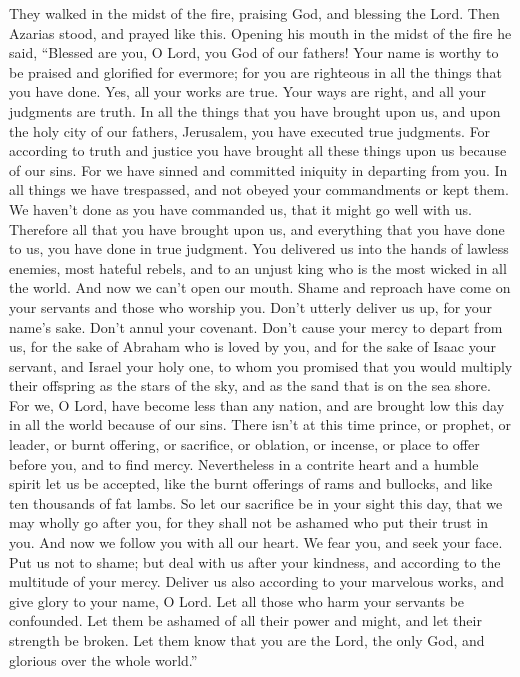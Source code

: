  They walked in the midst of the fire, praising God, and
blessing the Lord.  Then Azarias stood, and prayed like
this. Opening his mouth in the midst of the fire he said, 
``Blessed are you, O Lord, you God of our fathers! Your name is worthy
to be praised and glorified for evermore;  for you are
righteous in all the things that you have done. Yes, all your works are
true. Your ways are right, and all your judgments are truth.
 In all the things that you have brought upon us, and upon
the holy city of our fathers, Jerusalem, you have executed true
judgments. For according to truth and justice you have brought all these
things upon us because of our sins.  For we have sinned and
committed iniquity in departing from you.  In all things we
have trespassed, and not obeyed your commandments or kept them. We
haven't done as you have commanded us, that it might go well with us.
 Therefore all that you have brought upon us, and
everything that you have done to us, you have done in true judgment.
 You delivered us into the hands of lawless enemies, most
hateful rebels, and to an unjust king who is the most wicked in all the
world.  And now we can't open our mouth. Shame and reproach
have come on your servants and those who worship you. 
Don't utterly deliver us up, for your name's sake. Don't annul your
covenant.  Don't cause your mercy to depart from us, for
the sake of Abraham who is loved by you, and for the sake of Isaac your
servant, and Israel your holy one,  to whom you promised
that you would multiply their offspring as the stars of the sky, and as
the sand that is on the sea shore.  For we, O Lord, have
become less than any nation, and are brought low this day in all the
world because of our sins.  There isn't at this time
prince, or prophet, or leader, or burnt offering, or sacrifice, or
oblation, or incense, or place to offer before you, and to find mercy.
 Nevertheless in a contrite heart and a humble spirit let
us be accepted,  like the burnt offerings of rams and
bullocks, and like ten thousands of fat lambs. So let our sacrifice be
in your sight this day, that we may wholly go after you, for they shall
not be ashamed who put their trust in you.  And now we
follow you with all our heart. We fear you, and seek your face.
 Put us not to shame; but deal with us after your kindness,
and according to the multitude of your mercy.  Deliver us
also according to your marvelous works, and give glory to your name, O
Lord. Let all those who harm your servants be confounded. 
Let them be ashamed of all their power and might, and let their strength
be broken.  Let them know that you are the Lord, the only
God, and glorious over the whole world.''

